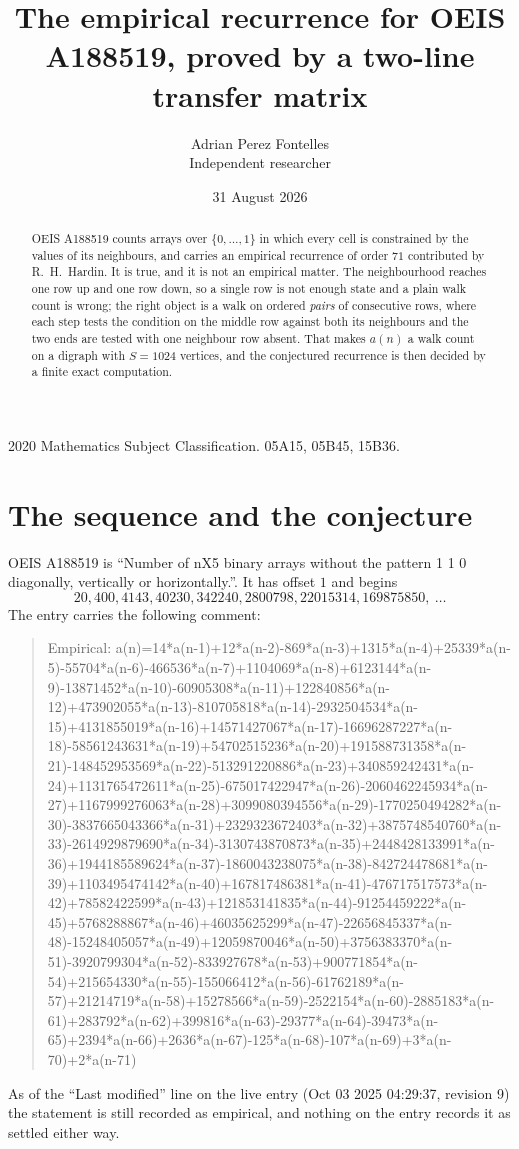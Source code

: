 \documentclass[11pt,a4paper]{article}
\title{The empirical recurrence for OEIS A188519, proved by a two-line transfer matrix}
\author{Adrian Perez Fontelles\\ \small Independent researcher}
\date{31 August 2026}
\theoremstyle{plain}
\theoremstyle{definition}
\begin{document}
\maketitle

\begin{abstract}
OEIS A188519 counts arrays over $\{0,\dots,1\}$ in which every cell is constrained by the
values of its neighbours, and carries an empirical recurrence of order $71$ contributed
by R.~H.~Hardin. It is true, and it is not an empirical matter. The neighbourhood reaches one
row up and one row down, so a single row is not enough state and a plain walk count
is wrong; the right object is a walk on ordered \emph{pairs} of consecutive rows, where
each step tests the condition on the middle row against both its neighbours and the two
ends are tested with one neighbour row absent. That makes $a(n)$ a walk count on a digraph
with $S=1024$ vertices, and the conjectured recurrence is then decided by a finite exact
computation.
\end{abstract}

\noindent\small 2020 Mathematics Subject Classification. 05A15, 05B45, 15B36.\normalsize

\section{The sequence and the conjecture}

OEIS A188519 is ``Number of nX5 binary arrays without the pattern 1 1 0 diagonally, vertically or horizontally.''. It has offset $1$ and begins
\[
20, 400, 4143, 40230, 342240, 2800798, 22015314, 169875850,\ \dots
\]
The entry carries the following comment:
\begin{quote}\small
Empirical: a(n)=14*a(n-1)+12*a(n-2)-869*a(n-3)+1315*a(n-4)+25339*a(n-5)-55704*a(n-6)-466536*a(n-7)+1104069*a(n-8)+6123144*a(n-9)-13871452*a(n-10)-60905308*a(n-11)+122840856*a(n-12)+473902055*a(n-13)-810705818*a(n-14)-2932504534*a(n-15)+4131855019*a(n-16)+14571427067*a(n-17)-16696287227*a(n-18)-58561243631*a(n-19)+54702515236*a(n-20)+191588731358*a(n-21)-148452953569*a(n-22)-513291220886*a(n-23)+340859242431*a(n-24)+1131765472611*a(n-25)-675017422947*a(n-26)-2060462245934*a(n-27)+1167999276063*a(n-28)+3099080394556*a(n-29)-1770250494282*a(n-30)-3837665043366*a(n-31)+2329323672403*a(n-32)+3875748540760*a(n-33)-2614929879690*a(n-34)-3130743870873*a(n-35)+2448428133991*a(n-36)+1944185589624*a(n-37)-1860043238075*a(n-38)-842724478681*a(n-39)+1103495474142*a(n-40)+167817486381*a(n-41)-476717517573*a(n-42)+78582422599*a(n-43)+121853141835*a(n-44)-91254459222*a(n-45)+5768288867*a(n-46)+46035625299*a(n-47)-22656845337*a(n-48)-15248405057*a(n-49)+12059870046*a(n-50)+3756383370*a(n-51)-3920799304*a(n-52)-833927678*a(n-53)+900771854*a(n-54)+215654330*a(n-55)-155066412*a(n-56)-61762189*a(n-57)+21214719*a(n-58)+15278566*a(n-59)-2522154*a(n-60)-2885183*a(n-61)+283792*a(n-62)+399816*a(n-63)-29377*a(n-64)-39473*a(n-65)+2394*a(n-66)+2636*a(n-67)-125*a(n-68)-107*a(n-69)+3*a(n-70)+2*a(n-71)
\end{quote}
As of the ``Last modified'' line on the live entry (Oct 03 2025 04:29:37, revision 9) the statement is
still recorded as empirical, and nothing on the entry records it as settled either way.
\end{document}
